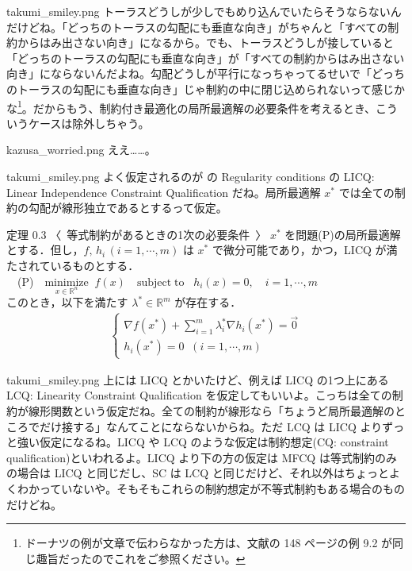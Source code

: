 \documentclass[b5paper,xelatex,ja=standard,10pt]{bxjsarticle}
\begin{document}
\begin{SERIFU}[colback=PaleGold, colbacktitle=PaleGold2]{takumi_smiley.png}
トーラスどうしが少しでもめり込んでいたらそうならないんだけどね。「どっちのトーラスの勾配にも垂直な向き」がちゃんと「すべての制約からはみ出さない向き」になるから。でも、トーラスどうしが接していると「どっちのトーラスの勾配にも垂直な向き」が「すべての制約からはみ出さない向き」にならないんだよね。勾配どうしが平行になっちゃってるせいで「どっちのトーラスの勾配にも垂直な向き」じゃ制約の中に閉じ込められないって感じかな\footnote{ドーナツの例が文章で伝わらなかった方は、文献\cite{kanamori}の 148 ページの例 9.2 が同じ趣旨だったのでこれをご参照ください。}。だからもう、制約付き最適化の局所最適解の必要条件を考えるとき、こういうケースは除外しちゃう。
\end{SERIFU}

\begin{SERIFU}[colback=PaleIris, colbacktitle=PaleIris2]{kazusa_worried.png}
ええ……。
\end{SERIFU}

\begin{SERIFU}[colback=PaleGold, colbacktitle=PaleGold2]{takumi_smiley.png}
よく仮定されるのが \cite{wikipedia_en} の Regularity conditions の LICQ: Linear Independence Constraint Qualification だね。局所最適解 $x^\ast$ では全ての制約の勾配が線形独立であるとするって仮定。
\end{SERIFU}

\begin{PROP}[colback=White]{定理 0.3 〈\, 等式制約があるときの1次の必要条件 \,〉}
$x^\ast$ を問題(P)の局所最適解とする．但し，$f, \, h_i \, (i = 1, \cdots, m)$ は $x^\ast$ で微分可能であり，かつ，LICQ が満たされているものとする．
\\[5pt]
　(P)　$\displaystyle \underset{x \in \mathbb{R}^n}{\mathrm{minimize}} \; \; f(x) \quad  \mathrm{subject \; to}   \; \; \; h_i(x) = 0,  \quad i = 1, \cdots, m$
\\[5pt]
このとき，以下を満たす $\lambda^\ast \in \mathbb{R}^m$ が存在する．
\begin{eqnarray*}
\left\{
\begin{array}{l}
\displaystyle \nabla f (x^\ast) + \sum_{i=1}^m \lambda^\ast_i \nabla h_i (x^\ast) = \vec{0}
\\[5pt]
h_i(x^\ast) = 0 \; \; (i = 1, \cdots, m)
\end{array}
\right.
\end{eqnarray*}
\end{PROP}

\begin{SERIFU}[colback=PaleGold, colbacktitle=PaleGold2]{takumi_smiley.png}
上には LICQ とかいたけど、例えば LICQ の1つ上にある LCQ: Linearity Constraint Qualification を仮定してもいいよ。こっちは全ての制約が線形関数という仮定だね。全ての制約が線形なら「ちょうど局所最適解のところでだけ接する」なんてことにならないからね。ただ LCQ は LICQ よりずっと強い仮定になるね。LICQ や LCQ のような仮定は制約想定(CQ: constraint qualification)といわれるよ。LICQ より下の方の仮定は MFCQ は等式制約のみの場合は LICQ と同じだし、SC は LCQ と同じだけど、それ以外はちょっとよくわかっていないや。そもそもこれらの制約想定が不等式制約もある場合のものだけどね。
\end{SERIFU}
\end{document}
